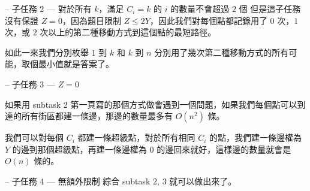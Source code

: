 \documentclass[hyperref,UTF8,notheorems,xcolor={dvipsnames}]{beamer}
\newcommand{\btitle}[1]{{\secname} -- #1}
\theoremstyle{definition}
\begin{document}
\begin{frame}[fragile]{\btitle{子任務 2 --- 對於所有 $k$，滿足 $C_i = k$ 的 $i$ 的數量不會超過 $2$ 個}}
	但是這子任務沒有保證 $Z = 0$，因為題目限制 $Z \le 2Y$，因此我們對每個點都記錄用了 $0$ 次，$1$ 次，或 $2$ 次以上的第二種移動方式到這個點的最短路徑。
	\pause
	
	如此一來我們分別枚舉 $1$ 到 $k$ 和 $k$ 到 $n$ 分別用了幾次第二種移動方式的所有可能，取個最小值就是答案了。
\end{frame}

\begin{frame}[fragile]{\btitle{子任務 3 --- $Z = 0$}}
	
	如果用 subtask 2 第一頁寫的那個方式做會遇到一個問題，如果我們每個點可以到達的所有街區都建一條邊，那邊的數量最多有 $O(n^2)$ 條。
	\pause

	我們可以對每個 $C_i$ 都建一條超級點，對於所有相同 $C_i$ 的點，我們建一條邊權為 $Y$ 的邊到那個超級點，再建一條邊權為 $0$ 的邊回來就好，這樣邊的數量就會是 $O(n)$ 條的。
	
\end{frame}

\begin{frame}[fragile]{\btitle{子任務 4 --- 無額外限制}}
	綜合 subtask 2, 3 就可以做出來了。
\end{frame}
\end{document}
